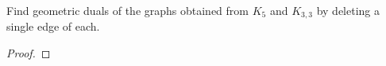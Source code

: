 \prob
{
    Find geometric duals of the graphs obtained from $K_5$ and $K_{3,3}$ by
    deleting a single edge of each.
}
\begin{proof}
\end{proof}